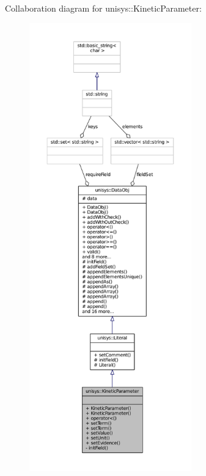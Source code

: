 Collaboration diagram for unisys\-:\-:Kinetic\-Parameter\-:
\nopagebreak
\begin{figure}[H]
\begin{center}
\leavevmode
\includegraphics[height=550pt]{classunisys_1_1KineticParameter__coll__graph}
\end{center}
\end{figure}
